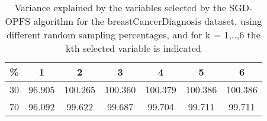 \begin{table}
	\begin{center}
		\begin{tabular}{c c c c c c c}
			\% & 1 & 2 & 3 & 4 & 5 & 6 \\
			\hline
			30 & 96.905 & 100.265 & 100.360 & 100.379 & 100.386 & 100.386 \\
			70 & 96.092 & 99.622 & 99.687 & 99.704 & 99.711 & 99.711 \\
		\end{tabular}
	\end{center}
	\caption{Variance explained by the variables selected by the SGD-OPFS algorithm for the breastCancerDiagnosis dataset, using different random sampling percentages, and for k = 1,..,6 the kth selected variable is indicated}
\end{table}